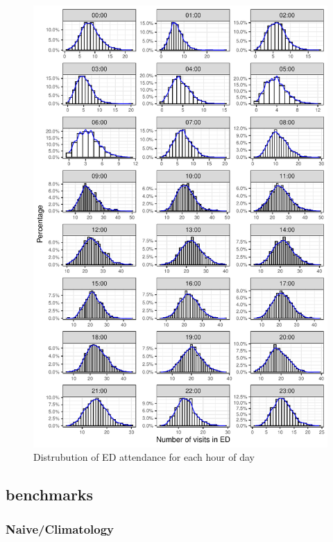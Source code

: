 \documentclass[]{elsarticle} %
\begin{document}
\begin{figure}[H]

{\centering \includegraphics{paper_files/figure-latex/24hour-1} 

}

\caption{Distrubution of ED attendance for each hour of day}\label{fig:24hour}
\end{figure}

\hypertarget{benchmarks}{%
\subsection{benchmarks}\label{benchmarks}}

\hypertarget{naiveclimatology}{%
\subsubsection{Naive/Climatology}\label{naiveclimatology}}
\end{document}

